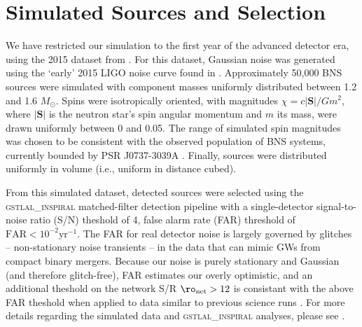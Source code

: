 \section{Simulated Sources and Selection}

We have restricted our simulation to the first year of the advanced detector era, using the 2015 dataset from \citet{Singer_2014}.  For this dataset, Gaussian noise was generated using the `early' 2015 LIGO noise curve found in \cite{Barsotti:2012}.  Approximately 50,000 BNS sources were simulated with component masses uniformly distributed between 1.2 and 1.6 $M_\odot$.  Spins were isotropically oriented, with magnitudes $\chi = c |\mathbf{S}|/G m^2$, where $|\mathbf{S}|$ is the neutron star's spin angular momentum and $m$ its mass, were drawn uniformly between 0 and 0.05.  The range of simulated spin magnitudes was chosen to be consistent with the observed population of BNS systems, currently bounded by PSR J0737-3039A \cite{Burgay_2003,Brown_2012}.  Finally, sources were distributed uniformly in volume (i.e., uniform in distance cubed).

From this simulated dataset, detected sources were selected using the \textsc{gstlal\_inspiral} matched-filter detection pipeline \cite{Cannon_2012} with a single-detector signal-to-noise ratio (S/N) theshold of 4, false alarm rate (FAR) threshold of $\mathrm{FAR}<10^{-2}\mathrm{yr}^{-1}$.  The FAR for real detector noise is largely governed by glitches -- non-stationary noise transients -- in the data that can mimic GWs from compact binary mergers.  Because our noise is purely stationary and Gaussian (and therefore glitch-free), FAR estimates our overly optimistic, and an additional theshold on the network S/R $\ro_\mathrm{net} > 12$ is consistant with the above FAR theshold when applied to data similar to previous science runs \cite{2013arXiv1304.0670L}.  For more details regarding the simulated data and \textsc{gstlal\_inspiral} analyses, please see \citet{2013arXiv1304.0670L}.